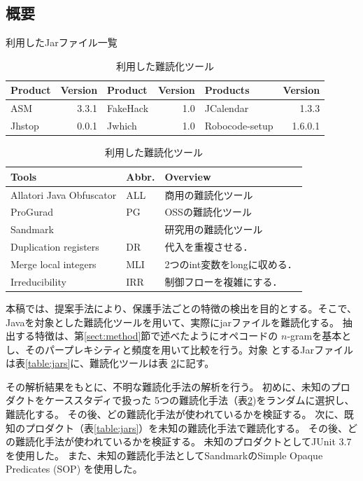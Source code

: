 \documentclass[a4j,fleqn,10pt]{jarticle}
\begin{document}
\subsection{概要}

\begin{table}[t]
  \centering
  \footnotesize{
    \caption{利用したJarファイル一覧}\label{table:jars}
  \begin{tabular}{l|r||l|r||l|r}
    Product & Version & Product & Version & Products & Version \\ \hline
    ASM       & 3.3.1 & FakeHack  & 1.0 &JCalendar & 1.3.3   \\
    Jhstop    & 0.0.1 & Jwhich    & 1.0   & Robocode-setup & 1.6.0.1 
  \end{tabular}
  \caption{利用した難読化ツール}\label{table:tools}
  \begin{tabular}{ll|l}
      Tools & Abbr. & Overview \\ \hline
      Allatori Java Obfuscator & ALL & 商用の難読化ツール \\ \hline
      ProGurad                 & PG & OSSの難読化ツール \\ \hline
      Sandmark                 & & 研究用の難読化ツール \\
      \hspace{0.2cm} Duplication registers & DR & 代入を重複させる．\\
      \hspace{0.2cm} Merge local integers & MLI & 2つのint変数をlongに収める．\\
      \hspace{0.2cm} Irreducibility       & IRR & 制御フローを複雑にする．\\
  \end{tabular}}
\end{table}

本稿では、提案手法により、保護手法ごとの特徴の検出を目的とする。そこで、
Javaを対象とした難読化ツールを用いて、実際にjarファイルを難読化する。
抽出する特徴は、第\ref{sect:method}節で述べたようにオペコードの
$n$-gramを基本とし、そのパープレキシティと頻度を用いて比較を行う。対象
とするJarファイルは表\ref{table:jars}に、難読化ツールは表
\ref{table:tools}に記す。

その解析結果をもとに、不明な難読化手法の解析を行う。
初めに、未知のプロダクトをケーススタディで扱った
5つの難読化手法（表\ref{table:tools})をランダムに選択し、難読化する。
その後、どの難読化手法が使われているかを検証する。
次に、既知のプロダクト（表\ref{table:jars}）を未知の難読化手法で難読化する。
その後、どの難読化手法が使われているかを検証する。
未知のプロダクトとしてJUnit 3.7を使用した。
また、未知の難読化手法としてSandmarkのSimple Opaque Predicates (SOP) を使用した。
\end{document}

